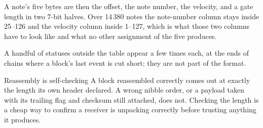 A note's five bytes are then the offset, the note number, the velocity, and a gate length
in two 7-bit halves. Over 14\,380 notes the note-number column stays inside 25--126 and
the velocity column inside 1--127, which is what those two columns have to look like and
what no other assignment of the five produces.

A handful of statuses outside the table appear a few times each, at the ends of chains
where a block's last event is cut short; they are not part of the format.

\begin{note}{Reassembly is self-checking}
A block reassembled correctly comes out at exactly the length its own header declared. A
wrong nibble order, or a payload taken with its trailing flag and checksum still attached,
does not. Checking the length is a cheap way to confirm a receiver is unpacking correctly
before trusting anything it produces.
\end{note}
